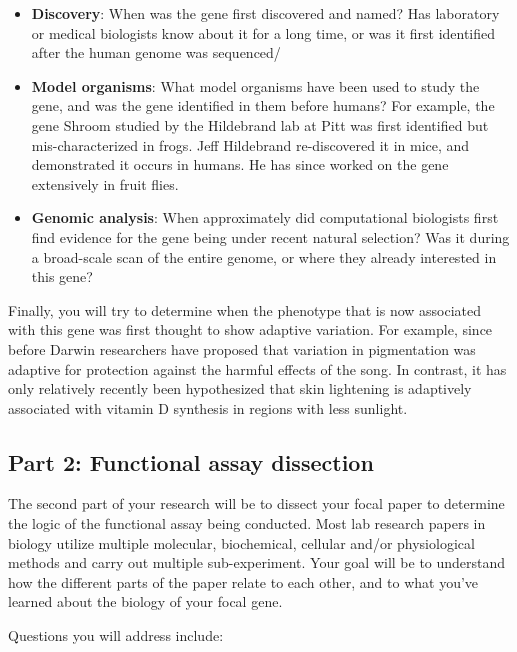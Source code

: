\documentclass[
]{book}
\providecommand{\tightlist}{%
  \setlength{\itemsep}{0pt}\setlength{\parskip}{0pt}}
\begin{document}
\begin{itemize}
\tightlist
\item
  \textbf{Discovery}: When was the gene first discovered and named? Has laboratory or medical biologists know about it for a long time, or was it first identified after the human genome was sequenced/
\item
  \textbf{Model organisms}: What model organisms have been used to study the gene, and was the gene identified in them before humans? For example, the gene Shroom studied by the Hildebrand lab at Pitt was first identified but mis-characterized in frogs. Jeff Hildebrand re-discovered it in mice, and demonstrated it occurs in humans. He has since worked on the gene extensively in fruit flies.
\item
  \textbf{Genomic analysis}: When approximately did computational biologists first find evidence for the gene being under recent natural selection? Was it during a broad-scale scan of the entire genome, or where they already interested in this gene?
\end{itemize}

Finally, you will try to determine when the phenotype that is now associated with this gene was first thought to show adaptive variation. For example, since before Darwin researchers have proposed that variation in pigmentation was adaptive for protection against the harmful effects of the song. In contrast, it has only relatively recently been hypothesized that skin lightening is adaptively associated with vitamin D synthesis in regions with less sunlight.

\hypertarget{part-2-functional-assay-dissection}{%
\subsection{Part 2: Functional assay dissection}\label{part-2-functional-assay-dissection}}

The second part of your research will be to dissect your focal paper to determine the logic of the functional assay being conducted. Most lab research papers in biology utilize multiple molecular, biochemical, cellular and/or physiological methods and carry out multiple sub-experiment. Your goal will be to understand how the different parts of the paper relate to each other, and to what you've learned about the biology of your focal gene.

Questions you will address include:
\end{document}
